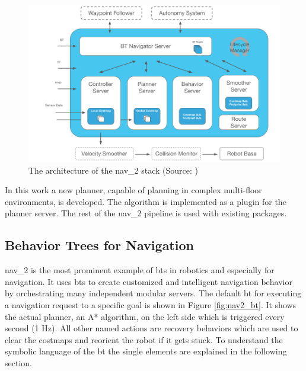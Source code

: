 \begin{figure}[h]
    \centering
    \includegraphics[width=\textwidth]{figures/20_state_of_the_art/nav2_architecture.png}
    \caption[The architecture of the \gls{nav_2} stack]{The architecture of the \gls{nav_2} stack (Source: \cite{steve_macenski_navigation_2020})}
    \label{fig:nav2_architecture}
\end{figure}

In this work a new planner, capable of planning in complex multi-floor environments, is developed. The algorithm is implemented as a plugin for the planner server. The rest of the \gls{nav_2} pipeline is used with existing packages.

\subsection{Behavior Trees for Navigation}

\gls{nav_2} is the most prominent example of \glspl{bt} in robotics and especially for navigation. It uses \glspl{bt} to create customized and intelligent navigation behavior by orchestrating many independent modular servers. The default \gls{bt} for executing a navigation request to a specific goal is shown in Figure \ref{fig:nav2_bt}. It shows the actual planner, an A* algorithm, on the left side which is triggered every second (1 Hz). All other named actions are recovery behaviors which are used to clear the costmaps and reorient the robot if it gets stuck. To understand the symbolic language of the \gls{bt} the single elements are explained in the following section.

